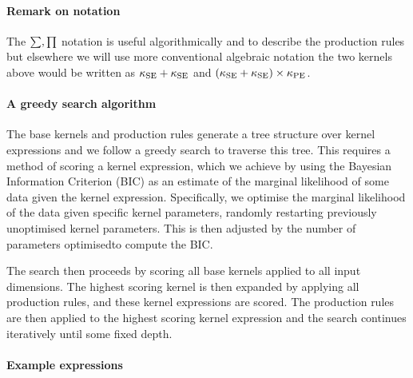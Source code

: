 \documentclass[twoside]{article}
\begin{document}
\paragraph{Remark on notation} The $\sum,\prod$ notation is useful algorithmically and to describe the production rules but elsewhere we will use more conventional algebraic notation \ie the two kernels above would be written as $\kappa_\textrm{SE} + \kappa_\textrm{SE}$ and ${(\kappa_\textrm{SE} + \kappa_\textrm{SE}) \times \kappa_\textrm{PE}}$.

\paragraph{A greedy search algorithm}
The base kernels and production rules generate a tree structure over kernel expressions and we follow a greedy search to traverse this tree.
This requires a method of scoring a kernel expression, which we achieve by using the Bayesian Information Criterion (BIC) as an estimate of the marginal likelihood of some data given the kernel expression\footnotemark.
Specifically, we optimise the marginal likelihood of the data given specific kernel parameters, randomly restarting previously unoptimised kernel parameters.
This is then adjusted by the number of parameters optimised\footnotemark to compute the BIC.

The search then proceeds by scoring all base kernels applied to all input dimensions.
The highest scoring kernel is then expanded by applying all production rules, and these kernel expressions are scored.
The production rules are then applied to the highest scoring kernel expression and the search continues iteratively until some fixed depth.

\paragraph{Example expressions}

\end{document}
